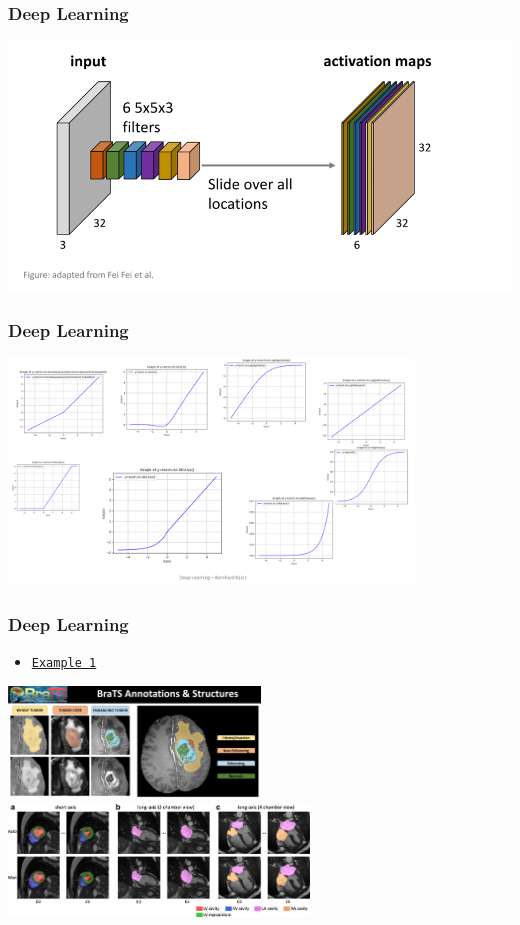\begin{frame}
    \frametitle{Deep Learning}
    \includegraphics{img/convolution.png}
\end{frame}

\begin{frame}
    \frametitle{Deep Learning}
    \includegraphics[height=6cm]{img/activation.png}
\end{frame}

\begin{frame}
    \frametitle{Deep Learning}
    \begin{itemize}
        \item \href{https://www.youtube.com/watch?v=81AvQQnpG4Q}{\texttt{Example 1}}
        \end{itemize}
        \begin{center}
    \includegraphics[height=3cm]{img/brats-tumor-subregions.jpg}
    \includegraphics[height=3cm]{img/cardiac.png}
     \end{center}
\end{frame}

